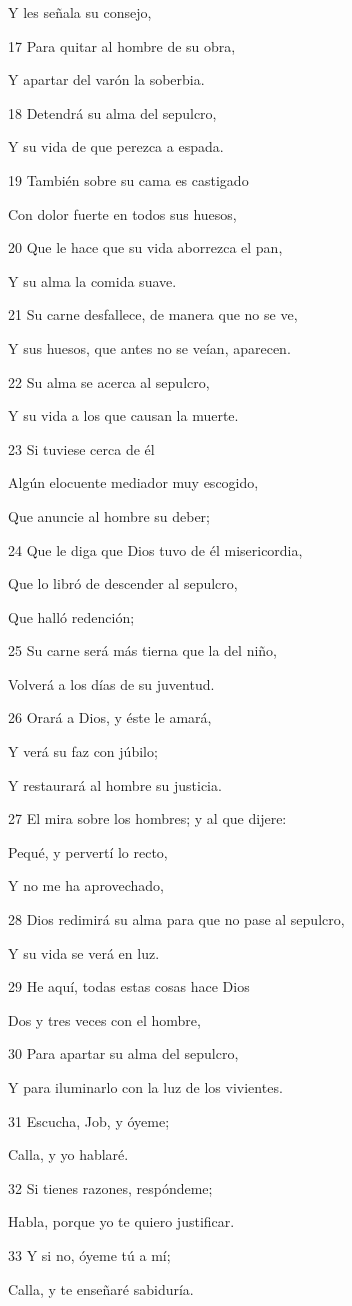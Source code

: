 \par Y les señala su consejo,
\par 17 Para quitar al hombre de su obra,
\par Y apartar del varón la soberbia.
\par 18 Detendrá su alma del sepulcro,
\par Y su vida de que perezca a espada.
\par 19 También sobre su cama es castigado
\par Con dolor fuerte en todos sus huesos,
\par 20 Que le hace que su vida aborrezca el pan,
\par Y su alma la comida suave.
\par 21 Su carne desfallece, de manera que no se ve,
\par Y sus huesos, que antes no se veían, aparecen.
\par 22 Su alma se acerca al sepulcro,
\par Y su vida a los que causan la muerte.
\par 23 Si tuviese cerca de él
\par Algún elocuente mediador muy escogido,
\par Que anuncie al hombre su deber;
\par 24 Que le diga que Dios tuvo de él misericordia,
\par Que lo libró de descender al sepulcro,
\par Que halló redención;
\par 25 Su carne será más tierna que la del niño,
\par Volverá a los días de su juventud.
\par 26 Orará a Dios, y éste le amará,
\par Y verá su faz con júbilo;
\par Y restaurará al hombre su justicia.
\par 27 El mira sobre los hombres; y al que dijere:
\par Pequé, y pervertí lo recto,
\par Y no me ha aprovechado,
\par 28 Dios redimirá su alma para que no pase al sepulcro,
\par Y su vida se verá en luz.
\par 29 He aquí, todas estas cosas hace Dios
\par Dos y tres veces con el hombre,
\par 30 Para apartar su alma del sepulcro,
\par Y para iluminarlo con la luz de los vivientes.
\par 31 Escucha, Job, y óyeme;
\par Calla, y yo hablaré.
\par 32 Si tienes razones, respóndeme;
\par Habla, porque yo te quiero justificar.
\par 33 Y si no, óyeme tú a mí;
\par Calla, y te enseñaré sabiduría. 

